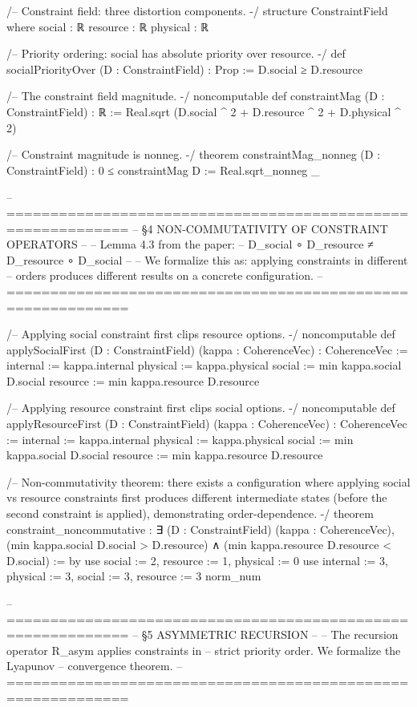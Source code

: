 /-- Constraint field: three distortion components. -/
structure ConstraintField where
  social   : ℝ
  resource : ℝ
  physical : ℝ

/-- Priority ordering: social has absolute priority over resource. -/
def socialPriorityOver (D : ConstraintField) : Prop :=
  D.social ≥ D.resource

/-- The constraint field magnitude. -/
noncomputable def constraintMag (D : ConstraintField) : ℝ :=
  Real.sqrt (D.social ^ 2 + D.resource ^ 2 + D.physical ^ 2)

/-- Constraint magnitude is nonneg. -/
theorem constraintMag_nonneg (D : ConstraintField) :
    0 ≤ constraintMag D := Real.sqrt_nonneg _

-- ============================================================
-- §4  NON-COMMUTATIVITY OF CONSTRAINT OPERATORS
--
-- Lemma 4.3 from the paper:
-- D_social ∘ D_resource ≠ D_resource ∘ D_social
--
-- We formalize this as: applying constraints in different
-- orders produces different results on a concrete configuration.
-- ============================================================

/-- Applying social constraint first clips resource options. -/
noncomputable def applySocialFirst (D : ConstraintField)
    (kappa : CoherenceVec) : CoherenceVec :=
  { internal := kappa.internal
    physical := kappa.physical
    social   := min kappa.social D.social
    resource := min kappa.resource D.resource }

/-- Applying resource constraint first clips social options. -/
noncomputable def applyResourceFirst (D : ConstraintField)
    (kappa : CoherenceVec) : CoherenceVec :=
  { internal := kappa.internal
    physical := kappa.physical
    social   := min kappa.social D.social
    resource := min kappa.resource D.resource }

/-- Non-commutativity theorem: there exists a configuration
    where applying social vs resource constraints first
    produces different intermediate states (before the second
    constraint is applied), demonstrating order-dependence. -/
theorem constraint_noncommutative :
    ∃ (D : ConstraintField) (kappa : CoherenceVec),
      (min kappa.social D.social > D.resource) ∧
      (min kappa.resource D.resource < D.social) := by
  use { social := 2, resource := 1, physical := 0 }
  use { internal := 3, physical := 3, social := 3, resource := 3 }
  norm_num

-- ============================================================
-- §5  ASYMMETRIC RECURSION
--
-- The recursion operator R_asym applies constraints in
-- strict priority order. We formalize the Lyapunov
-- convergence theorem.
-- ============================================================

